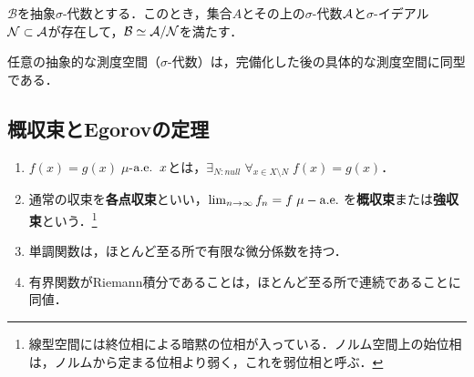 \documentclass[uplatex, dvipdfmx]{jsreport}
\renewcommand{\B}{\mathcal{B}}
\begin{document}
\begin{theorem}
    $\B$を抽象$\sigma$-代数とする．このとき，集合$A$とその上の$\sigma$-代数$\mathcal{A}$と$\sigma$-イデアル$\mathcal{N}\subset\mathcal{A}$が存在して，$\B\simeq\A/\cN$を満たす．
\end{theorem}

\begin{corollary}
    任意の抽象的な測度空間（$\sigma$-代数）は，完備化した後の具体的な測度空間に同型である．
\end{corollary}

\subsection{概収束とEgorovの定理}

\begin{example}\mbox{}
    \begin{enumerate}
        \item $f(x)=g(x)\;\mu$-$\mathrm{a.e.}\;\;x$とは，$\exists_{N:null}\;\forall_{x\in X\setminus N}\;f(x)=g(x)$．
        \item 通常の収束を\textbf{各点収束}といい，$\lim_{n\to\infty}f_n=f\;\mu-\mathrm{a.e.}\;$を\textbf{概収束}または\textbf{強収束}という．\footnote{線型空間には終位相による暗黙の位相が入っている．ノルム空間上の始位相は，ノルムから定まる位相より弱く，これを弱位相と呼ぶ．}
        \item 単調関数は，ほとんど至る所で有限な微分係数を持つ．
        \item 有界関数がRiemann積分であることは，ほとんど至る所で連続であることに同値．
    \end{enumerate}
\end{example}
\end{document}
